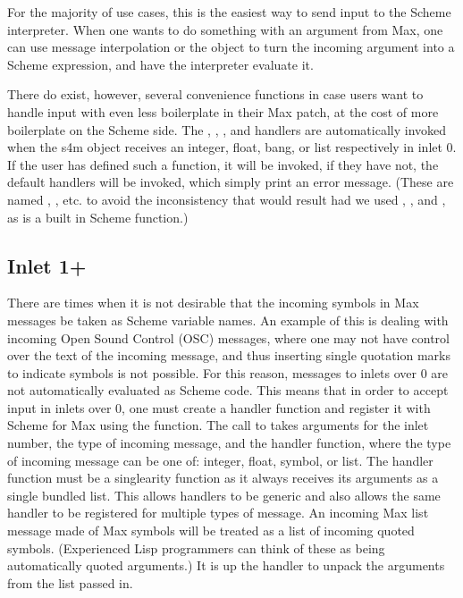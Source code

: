 \documentclass[letterpaper,10pt,english]{sphinxmanual}
\begin{document}
\sphinxAtStartPar
For the majority of use cases, this is the easiest way to send input to the Scheme interpreter.
When one wants to do something with an argument from Max, one can use message interpolation or the  object
to turn the incoming argument into a Scheme expression, and have the interpreter evaluate it.

\sphinxAtStartPar
There do exist, however, several convenience functions in case users want to handle input with even less boilerplate in their Max patch,
at the cost of more boilerplate on the Scheme side.
The , , , and  handlers are automatically invoked when the s4m object receives an
integer, float, bang, or list respectively in inlet 0.
If the user has defined such a function, it will be invoked, if they have not, the default handlers will be invoked, which
simply print an error message.
(These are named , , etc. to avoid the inconsistency that would result had we used , , and ,
as  is a built in Scheme function.)


\subsection{Inlet 1+}
\label{\detokenize{features_usage:inlet-1}}
\sphinxAtStartPar
There are times when it is not desirable that the incoming symbols in Max messages be taken as Scheme variable names.
An example of this is dealing with incoming Open Sound Control (OSC) messages, where one may not have control over
the text of the incoming message,
and thus inserting single quotation marks to indicate symbols is not possible.
For this reason, messages to inlets over 0 are not automatically evaluated as Scheme code.
This means that in order to accept input in inlets over 0, one must create a handler function and register it with
Scheme for Max using the  function.
The call to  takes arguments for the inlet number, the type of incoming
message, and the handler function, where the type of incoming message can be one of: integer, float, symbol, or list.
The handler function must be a single\sphinxhyphen{}arity function as it always receives its arguments as a single bundled list.
This allows handlers to be generic and also allows the same handler to be registered for multiple types of message.
An incoming Max list message made of Max symbols will be treated as a list of incoming quoted symbols.
(Experienced Lisp programmers can think of these as being automatically quoted arguments.)
It is up the handler to unpack the arguments from the list passed in.
\end{document}
